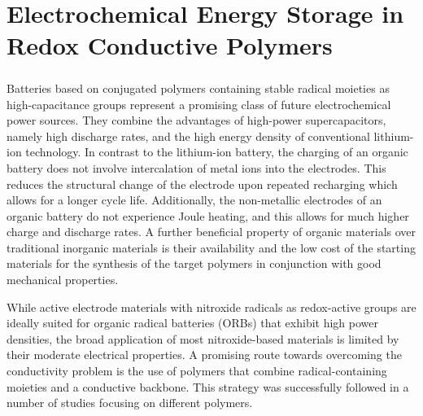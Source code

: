 \chapter{Electrochemical Energy Storage in Redox Conductive Polymers}

\paragraph*{}
Batteries based on conjugated polymers containing stable radical moieties as high-capacitance groups represent a promising class of future electrochemical power sources.\cite{nakahara2002_cpl, nishide2004_electact,xie2021_mathoriz,Rohland2022} They combine the advantages of high-power supercapacitors, namely high discharge rates, and the high energy density of conventional lithium-ion technology. In contrast to the lithium-ion battery, the charging of an organic battery does not involve intercalation of metal ions into the electrodes. This reduces the structural change of the electrode upon repeated recharging which allows for a longer cycle life. Additionally, the non-metallic electrodes of an organic battery do not experience Joule heating, and this allows for much higher charge and discharge rates. A further beneficial property of organic materials over traditional inorganic materials is their availability and the low cost of the starting materials for the synthesis of the target polymers in conjunction with good mechanical properties.\cite{janoschka2012_advmater, muench2016_chemrev, friebe2017_topcurrchem}
\par
While active electrode materials with nitroxide radicals as redox-active groups are ideally suited for organic radical batteries (ORBs) that exhibit high power densities, the broad application of most nitroxide-based materials is limited by their moderate electrical properties. A promising route towards overcoming the conductivity problem is the use of polymers that combine radical-containing moieties and a conductive backbone. This strategy was successfully followed in a number of studies focusing on different polymers.\cite{oyaizu2015_polymerjournal, bahaceci2013_jpowersources, katsumata2006_mrc, xu2014_electact, aydin2015_jsoistatelect, schwartz2018_synthmet}




